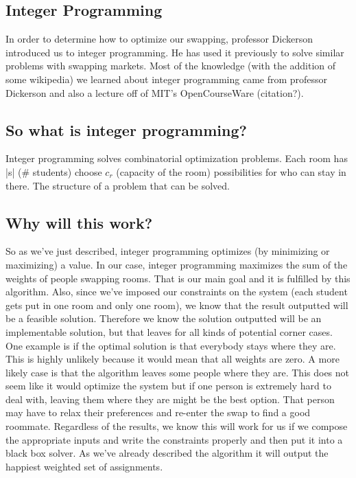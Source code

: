 \documentclass[12pt]{article}
\begin{document}
\begin{multicols}{2}

\section{Integer Programming}
In order to determine how to optimize our swapping, professor Dickerson introduced us to integer programming. He has used it previously to solve similar problems with swapping markets. Most of the knowledge (with the addition of some wikipedia) we learned about integer programming came from professor Dickerson and also a lecture off of MIT's OpenCourseWare (citation?). 

\subsection{So what is integer programming?}
Integer programming solves combinatorial optimization problems. Each room has |s| (\# students) choose $c_r$ (capacity of the room) possibilities for who can stay in there. The structure of a problem that can be solved.

\subsection{Why will this work?}
So as we've just described, integer programming optimizes (by minimizing or maximizing) a value. In our case, integer programming maximizes the sum of the weights of people swapping rooms. That is our main goal and it is fulfilled by this algorithm. Also, since we've imposed our constraints on the system (each student gets put in one room and only one room), we know that the result outputted will be a feasible solution. Therefore we know the solution outputted will be an implementable solution, but that leaves for all kinds of potential corner cases. One example is if the optimal solution is that everybody stays where they are. This is highly unlikely because it would mean that all weights are zero. A more likely case is that the algorithm leaves some people where they are. This does not seem like it would optimize the system but if one person is extremely hard to deal with, leaving them where they are might be the best option. That person may have to relax their preferences and re-enter the swap to find a good roommate. Regardless of the results, we know this will work for us if we compose the appropriate inputs and write the constraints properly and then put it into a black box solver. As we've already described the algorithm it will output the happiest weighted set of assignments.


\end{multicols}
\end{document}
